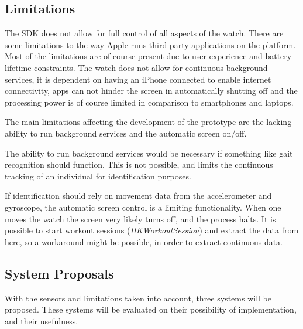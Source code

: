 \subsection{Limitations}
The SDK does not allow for full control of all aspects of the watch. There are
some limitations to the way Apple runs third-party applications on the platform.
Most of the limitations are of course present due to user experience and battery
lifetime constraints. The watch does not allow for continuous background services, it is
dependent on having an iPhone connected to enable internet connectivity, apps can not
hinder the screen in automatically shutting off and the processing power is of
course limited in comparison to smartphones and laptops.

The main limitations affecting the development of the prototype are the lacking
ability to run background services and the automatic screen on/off.

The ability to run background services would be necessary if something like gait
recognition should function. This is not possible, and limits the continuous
tracking of an individual for identification purposes. 

If identification should rely on movement data from the accelerometer and
gyroscope, the automatic screen control is a limiting functionality. When one
moves the watch the screen very likely turns off, and the process halts. It is
possible to start workout sessions (\textit{HKWorkoutSession}) 
\cite{workoutsession} and extract the data from here, so a workaround might be 
possible, in order to extract continuous data.


\subsection{System Proposals}
With the sensors and limitations taken into account, three systems will be
proposed. These systems will be evaluated on their possibility of
implementation, and their usefulness.

